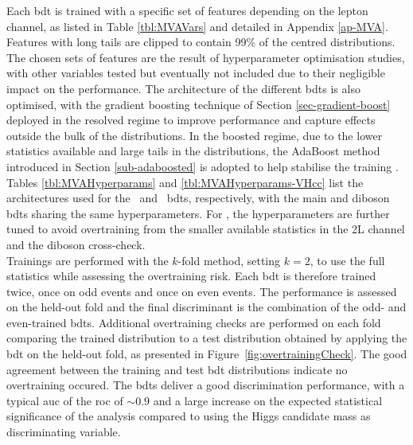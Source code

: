 Each \gls{bdt} is trained with a specific set of features depending on the lepton channel, as listed in Table \ref{tbl:MVAVars} and detailed in Appendix \ref{ap-MVA}. Features with long tails are clipped to contain 99\% of the centred distributions. The chosen sets of features are the result of hyperparameter optimisation studies, with other variables tested but eventually not included due to their negligible impact on the performance. The architecture of the different \glspl{bdt} is also optimised, with the gradient boosting technique of Section \ref{sec-gradient-boost} deployed in the resolved regime to improve performance and capture effects outside the bulk of the distributions. In the boosted regime, due to the lower statistics available and large tails in the distributions, the AdaBoost method introduced in Section \ref{sub-adaboosted} is adopted to help stabilise the training \cite{Adaboost}. Tables \ref{tbl:MVAHyperparams} and \ref{tbl:MVAHyperparams-VHcc} list the architectures used for the \vhb\ and \vhc\ \glspl{bdt}, respectively, with the main and diboson \glspl{bdt} sharing the same hyperparameters. For \vhc, the hyperparameters are further tuned to avoid overtraining from the smaller available statistics in the 2L channel and the diboson cross-check. \\

Trainings are performed with the $k$-fold method, setting $k = 2$, to use the full statistics while assessing the overtraining risk. Each \gls{bdt} is therefore trained twice, once on odd events and once on even events. The performance is assessed on the held-out fold and the final discriminant is the combination of the odd- and even-trained \glspl{bdt}. Additional overtraining checks are performed on each fold comparing the trained distribution to a test distribution obtained by applying the \gls{bdt} on the held-out fold, as presented in Figure~\ref{fig:overtrainingCheck}. The good agreement between the training and test \gls{bdt} distributions indicate no overtraining occured. The \glspl{bdt} deliver a good discrimination performance, with a typical \gls{auc} of the \gls{roc} of $\sim 0.9$ and a large increase on the expected statistical significance of the analysis compared to using the Higgs candidate mass as discriminating variable. \\

\newpage
\vspace*{\fill}

\vspace*{\fill}
\newpage
\vspace*{\fill}


